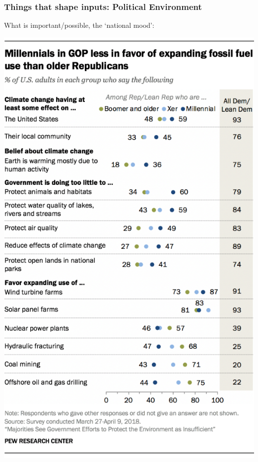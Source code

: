 \documentclass[aspectratio=169]{beamer}
\theoremstyle{principle}
\begin{document}
\begin{frame}
\frametitle{Things that shape inputs: Political Environment}
What is important/possible, the `national mood':
    \begin{center}
     \includegraphics[scale=0.35]{cc-gop.png}
     \end{center}

\end{frame}
\end{document}
